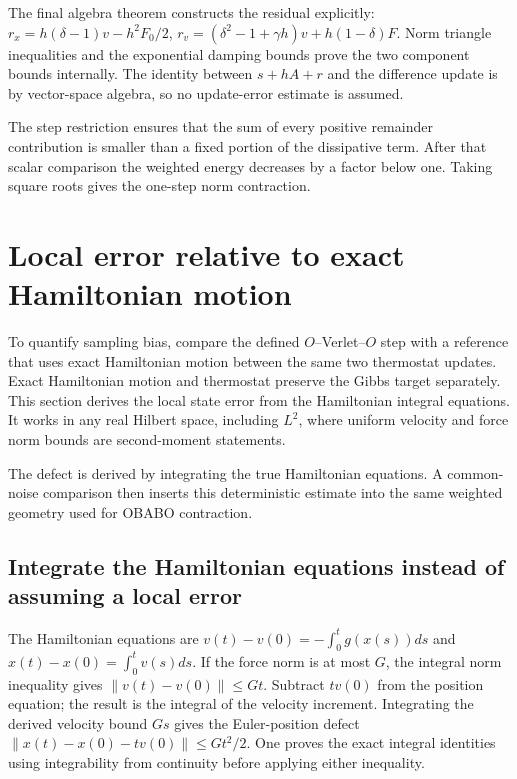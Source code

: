\documentclass[11pt,a4paper]{report}
\begin{document}
The final algebra theorem constructs the residual explicitly: \(r_x=h(\delta-1)v-h^2F_0/2\), \(r_v=(\delta^2-1+\gamma h)v+h(1-\delta)F\). Norm triangle inequalities and the exponential damping bounds prove the two component bounds internally. The identity between \(s+hA+r\) and the difference update is by vector-space algebra, so no update-error estimate is assumed.



The step restriction ensures that the sum of every positive remainder contribution is smaller than a fixed portion of the dissipative term. After that scalar comparison the weighted energy decreases by a factor below one. Taking square roots gives the one-step norm contraction.

\section{\texorpdfstring{Local error relative to exact Hamiltonian motion}{Local error relative to exact Hamiltonian motion}}
\label{proof-module-KineticLangevin-VerletLocal-lean}


To quantify sampling bias, compare the defined \(O\)–Verlet–\(O\) step with a reference that uses exact Hamiltonian motion between the same two thermostat updates. Exact Hamiltonian motion and thermostat preserve the Gibbs target separately. This section derives the local state error from the Hamiltonian integral equations. It works in any real Hilbert space, including \(L^{2}\), where uniform velocity and force norm bounds are second-moment statements.



The defect is derived by integrating the true Hamiltonian equations. A common-noise comparison then inserts this deterministic estimate into the same weighted geometry used for OBABO contraction.

\subsection{\texorpdfstring{Integrate the Hamiltonian equations instead of assuming a local error}{Integrate the Hamiltonian equations instead of assuming a local error}}
\label{report-step-KineticLangevin-VerletLocal-lean-1}


The Hamiltonian equations are \(v(t)-v(0)=-\int_0^t g(x(s))ds\) and \(x(t)-x(0)=\int_0^t v(s)ds\). If the force norm is at most \(G\), the integral norm inequality gives \(\|v(t)-v(0)\|\le Gt\). Subtract \(tv(0)\) from the position equation; the result is the integral of the velocity increment. Integrating the derived velocity bound \(Gs\) gives the Euler-position defect \(\|x(t)-x(0)-tv(0)\|\le Gt^2/2\). One proves the exact integral identities using integrability from continuity before applying either inequality.
\end{document}
